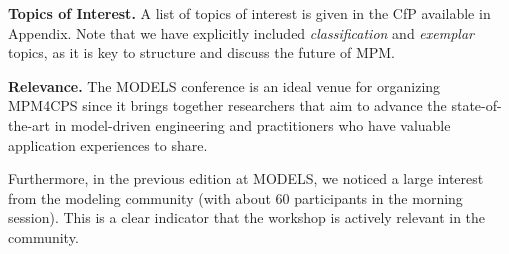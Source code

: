 \smallskip
\noindent
\textbf{Topics of Interest.}
%
A list of topics of interest is given in the CfP available in Appendix.
Note that we have explicitly included \emph{classification} and \emph{exemplar} 
topics, as it is key to structure and discuss the future of MPM. 



\noindent
\textbf{Relevance.}
%
The MODELS conference is an ideal venue for organizing MPM4CPS since it brings 
together researchers that aim to advance the state-of-the-art in model-driven 
engineering and practitioners who have valuable application experiences to share.

Furthermore, in the previous edition at MODELS, we noticed a large interest from the modeling community (with about 60 participants in the morning session). This is a clear indicator that the workshop is actively relevant in the community.




